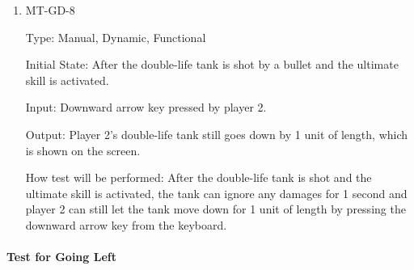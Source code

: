 \documentclass[12pt, titlepage]{article}
\begin{document}
\begin{enumerate}
\item{MT-GD-8\\}

Type: Manual, Dynamic, Functional
					
Initial State: After the double-life tank is shot by a bullet and the ultimate skill is activated.
					
Input: Downward arrow key pressed by player 2.
					
Output: Player 2's double-life tank still goes down by 1 unit of length, which is shown on the screen.
					
How test will be performed: After the double-life tank is shot and the ultimate skill is activated, the tank can ignore any damages for 1 second and player 2 can still let the tank move down for 1 unit of length by pressing the downward arrow key from the keyboard.

\end{enumerate}

\paragraph{Test for Going Left}
\end{document}
